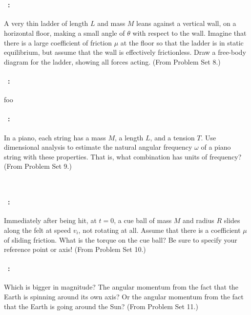 \documentclass[12pt]{article} 
\begin{document}
\vfill
~
\clearpage

\paragraph{\problemname~\theproblem:}%
A very thin ladder of length $L$ and mass $M$ leans against a vertical
wall, on a horizontal floor, making a small angle of $\theta$ with respect
to the wall.  Imagine that there is a large coefficient of friction
$\mu$ at the floor so that the ladder is in static
equilibrium, but assume that the wall is effectively frictionless.
Draw a free-body diagram for the ladder, showing all
forces acting.
(From Problem Set 8.)

\vfill

\paragraph{\problemname~\theproblem:}%
foo

\vfill

\paragraph{\problemname~\theproblem:}%
In a piano, each string has a mass $M$, a length $L$, and a tension $T$.
Use dimensional analysis to estimate the natural angular
frequency $\omega$ of a piano string with these properties. That is,
what combination has units of frequency?
(From Problem Set 9.)

\vfill
~
\clearpage

\paragraph{\problemname~\theproblem:}%
Immediately after being hit, at $t=0$, a cue ball of mass
$M$ and radius $R$ slides along the felt at speed $v_i$, not rotating
at all.
Assume that there is a
coefficient $\mu$ of sliding friction.
What is the torque on the cue ball? Be sure to specify your reference point or axis!
(From Problem Set 10.)

\vfill

\paragraph{\problemname~\theproblem:}%
Which is bigger in magnitude? The angular momentum from the fact
that the Earth is spinning around its own axis? Or the angular
momentum from the fact that the Earth is going around the Sun?
(From Problem Set 11.)
\end{document}
